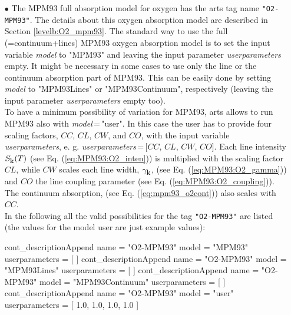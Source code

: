 \begin{itemize}
\item[$\bullet$] The MPM93 full absorption model for oxygen \citep{liebeetal:93}
     has the arts tag name {\tt "O2-MPM93"}. The details about this 
     oxygen absorption model are described in Section \ref{levelb:O2_mpm93}. 
     The standard way to use the full (=continuum+lines) MPM93 oxygen 
     absorption model is to set the input variable {\it model} 
     to "MPM93" and leaving the input parameter {\it userparameters} empty. 
     It might be necessary in some cases to use only the line or the 
     continuum absorption part of MPM93. This can be easily done 
     by setting {\it model} to "MPM93Lines" or "MPM93Continuum", 
     respectively (leaving the input parameter {\it userparameters} 
     empty too).\\ To have a minimum possibility of variation for MPM93, 
     arts allows to run MPM93 also with {\it model}\,=\,"user". 
     In this case the user has to provide four scaling factors,  
     $CC$, $CL$, $CW$, and $CO$, with the input variable {\it userparameters}, 
     e. g. {\it userparameters}\,=\,$[$$CC$, $CL$, $CW$, $CO$$]$. 
     Each line intensity $S_{\mbox{\rm \small k}}(T)$ (see Eq. (\ref{eq:MPM93:O2_inten})) 
     is multiplied with the scaling factor $CL$, while $CW$ scales 
     each line width, $\gamma_{\mbox{\rm \small k}}$, (see Eq. (\ref{eq:MPM93:O2_gamma})) and 
     $CO$ the line coupling parameter (see Eq. (\ref{eq:MPM93:O2_coupling})). 
     The continuum absorption, (see Eq. (\ref{eq:mpm93_o2cont})) 
     also scales with $CC$.\\
     In the following all the valid possibilities for the
     tag {\tt "O2-MPM93"} are listed (the values for the 
     model user are just example values):
\begin{code}
cont_descriptionAppend{
    name           = "O2-MPM93"
    model          = "MPM93"
    userparameters = [ ]
}
cont_descriptionAppend{
    name           = "O2-MPM93"
    model          = "MPM93Lines"
    userparameters = [ ]
}
cont_descriptionAppend{
    name           = "O2-MPM93"
    model          = "MPM93Continuum"
    userparameters = [ ]
}
cont_descriptionAppend{
    name           = "O2-MPM93"
    model          = "user"
    userparameters = [ 1.0, 1.0, 1.0, 1.0 ]
}
\end{code}


\end{itemize}
